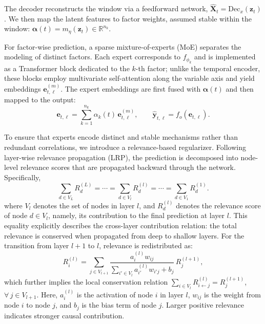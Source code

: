 ﻿\documentclass[journal]{IEEEtran}
\begin{document}
The decoder reconstructs the window via a feedforward network, $\widehat{\mathbf{X}}_t=\mathrm{Dec}_x(\mathbf{z}_t)$. We then map the latent features to factor weights, assumed stable within the window: $\boldsymbol{\alpha}(t)=m_{\eta}(\mathbf{z}_t)\in\mathbb{R}^{n_k}$.

For factor-wise prediction, a sparse mixture-of-experts (MoE) separates the modeling of distinct factors. Each expert corresponds to $f_{\phi_k}$ and is implemented as a Transformer block dedicated to the $k$-th factor; unlike the temporal encoder, these blocks employ multivariate self-attention along the variable axis and yield embeddings $\mathbf{e}^{(m)}_{t,\ell}$. The expert embeddings are first fused with $\boldsymbol{\alpha}(t)$ and then mapped to the output:
\begin{equation}
\mathbf{e}_{t,\ell}=\sum_{k=1}^{n_k}\alpha_{k}(t)\,\mathbf{e}^{(m)}_{t,\ell},\qquad
\widehat{\mathbf{y}}_{t,\ell}=f_o(\mathbf{e}_{t,\ell}).
\end{equation}

To ensure that experts encode distinct and stable mechanisms rather than redundant correlations, we introduce a relevance-based regularizer. Following layer-wise relevance propagation (LRP), the prediction is decomposed into node-level relevance scores that are propagated backward through the network. Specifically,
\begin{equation}
\sum_{d\in V_L}R_d^{(L)}=\cdots=\sum_{d\in V_l}R_d^{(l)}=\cdots=\sum_{d\in V_1}R_d^{(1)}.
\end{equation}
where $V_l$ denotes the set of nodes in layer $l$, and $R_d^{(l)}$ denotes the relevance score of node $d\in V_l$, namely, its contribution to the final prediction at layer $l$. This equality explicitly describes the cross-layer contribution relation: the total relevance is conserved when propagated from deep to shallow layers.
For the transition from layer $l+1$ to $l$, relevance is redistributed as:
\begin{equation}
R_i^{(l)}=\sum_{j\in V_{l+1}}\frac{a_i^{(l)}w_{ij}}{\sum_{i'\in V_l}a_{i'}^{(l)}w_{i'j}+b_j}\,R_j^{(l+1)},
\end{equation}
which further implies the local conservation relation $\sum_{i\in V_l}R_{i\leftarrow j}^{(l)}=R_j^{(l+1)}$, $\forall\, j\in V_{l+1}$. Here, $a_i^{(l)}$ is the activation of node $i$ in layer $l$, $w_{ij}$ is the weight from node $i$ to node $j$, and $b_j$ is the bias term of node $j$. Larger positive relevance indicates stronger causal contribution.
\end{document}
